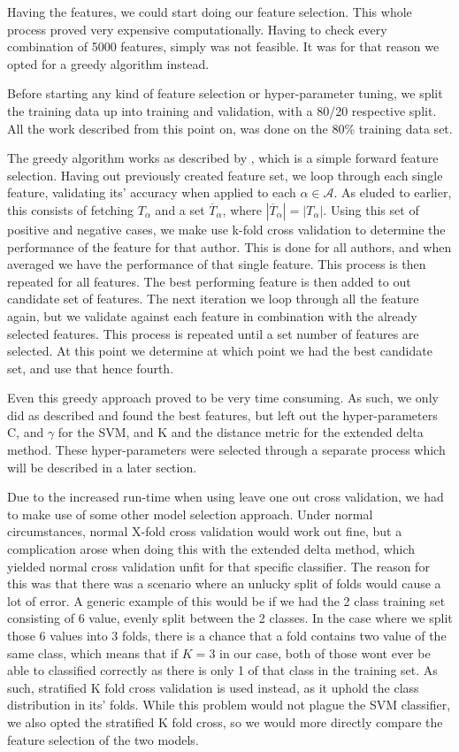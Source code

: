 Having the features, we could start doing our feature selection. This whole
process proved very expensive computationally. Having to check every combination
of 5000 features, simply was not feasible. It was for that reason we opted for a
greedy algorithm instead.

Before starting any kind of feature selection or hyper-parameter tuning,
we split the training data up into training and validation, with a
80/20 respective split. All the work described from this point on,
was done on the 80\% training data set.

The greedy algorithm works as described by \cite{kanDeng}, which is a simple
forward feature selection. Having out previously created feature set, we loop
through each single feature, validating its' accuracy when applied to each
$\alpha \in \mathcal{A}$. As eluded to earlier, this consists of fetching
$T_{\alpha}$ and a set $\overline{T}_{\alpha}$, where $|\overline{T}_\alpha| =
|T_\alpha|$. Using this set of positive and negative cases, we make use k-fold
cross validation to determine the performance of the feature for that author.
This is done for all authors, and when averaged we have the performance of
that single feature. This process is then repeated for all features. The best
performing feature is then added to out candidate set of features. The next
iteration we loop through all the feature again, but we validate against each
feature in combination with the already selected features. This process is
repeated until a set number of features are selected. At this point we determine
at which point we had the best candidate set, and use that hence fourth.

Even this greedy approach proved to be very time consuming. As such, we only did
as described and found the best features, but left out the hyper-parameters C,
and $\gamma$ for the SVM, and K and the distance metric for the extended delta
method. These hyper-parameters were selected through a separate process
which will be described in a later section.

Due to the increased run-time when using leave one out cross validation, we had
to make use of some other model selection approach. Under normal circumstances,
normal X-fold cross validation would work out fine, but a complication arose
when doing this with the extended delta method, which yielded normal cross
validation unfit for that specific classifier. The reason for this was that
there was a scenario where an unlucky split of folds would cause a lot of error.
A generic example of this would be if we had the 2 class training set consisting
of 6 value, evenly split between the 2 classes. In the case where we split those
6 values into 3 folds, there is a chance that a fold contains two value of the
same class, which means that if $K = 3$ in our case, both of those wont ever be
able to classified correctly as there is only 1 of that class in the training
set. As such, stratified K fold cross validation is used instead, as it uphold
the class distribution in its' folds. While this problem would not plague the
SVM classifier, we also opted the stratified K fold cross, so we would more
directly compare the feature selection of the two models.

